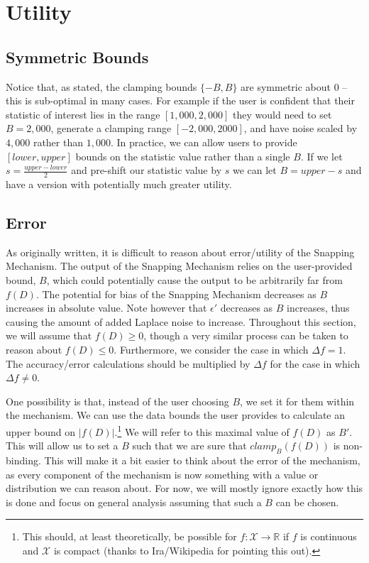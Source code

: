\documentclass[11pt]{scrartcl} %
\begin{document}
\section{Utility}
\label{sec:utility}

\subsection{Symmetric Bounds}
\label{subsec:symmetric_bounds}
Notice that, as stated, the clamping bounds $\{-B, B\}$ are symmetric about 0 -- this is sub-optimal in many cases. 
For example if the user is confident that their statistic of interest lies in the range $[1,000, 2,000]$ they 
would need to set $B = 2,000$, generate a clamping range $[-2,000, 2000]$, and have noise scaled by $4,000$ 
rather than $1,000$. In practice, we can allow users to provide $[lower, upper]$ bounds on the statistic value rather 
than a single $B$. If we let $s = \frac{upper - lower}{2}$ and pre-shift our statistic value by $s$ we can let 
$B = upper - s$ and have a version with potentially much greater utility.

\subsection{Error}
\label{subsec:error}
As originally written, it is difficult to reason about error/utility of the Snapping Mechanism. The output of the Snapping Mechanism relies on the user-provided bound, $B$, which could potentially cause the output to be arbitrarily far from $f(D)$. The potential for bias of the Snapping Mechanism decreases as $B$ increases in absolute value. Note however that $\epsilon'$ decreases as $B$ increases, thus causing the amount of added Laplace noise to increase. Throughout this section, we will assume that $f(D) \geq 0$, though a very similar process can be taken to reason about $f(D) \leq 0$. Furthermore, we consider the case in which $\Delta f = 1$.
The accuracy/error calculations should be multiplied by $\Delta f$ for the case in which $\Delta f \neq 0$. \newline

One possibility is that, instead of the user choosing $B$, we set it for them within the mechanism. We can use the data bounds the user provides to calculate an
upper bound on $\vert f(D) \vert$.\footnote{This should, at least theoretically, be possible for $f: \mathcal{X} \rightarrow \mathbb{R}$ if $f$ is continuous and $\mathcal{X}$ is compact (thanks to Ira/Wikipedia for pointing this out).} We will refer to this maximal value of $f(D)$ as $B'$. This will allow us to set a $B$ such that we are sure that $clamp_B \left( f(D) \right)$ is non-binding. This will make it a bit easier to think about the error of the mechanism, as every component of the mechanism is now something with a value or distribution we can reason about. For now, we will mostly ignore exactly how this is done and focus on general analysis assuming that such a $B$ can be chosen.
\end{document}
